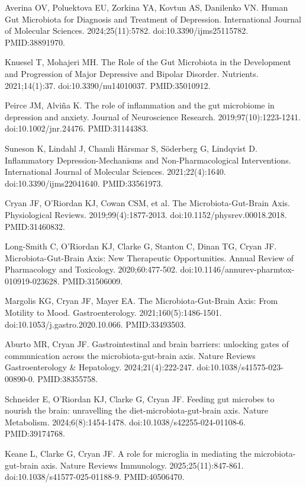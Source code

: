 \documentclass[12pt,oneside]{book}
\newcommand{\reff}[2]{\par\hangindent=7mm\hangafter=1\noindent[#1]\hspace{2mm}#2\par}
\begin{document}
\reff{50}{Averina OV, Poluektova EU, Zorkina YA, Kovtun AS, Danilenko VN. Human Gut Microbiota for Diagnosis and Treatment of Depression. International Journal of Molecular Sciences. 2024;25(11):5782. doi:10.3390/ijms25115782. PMID:38891970.}

\reff{51}{Knuesel T, Mohajeri MH. The Role of the Gut Microbiota in the Development and Progression of Major Depressive and Bipolar Disorder. Nutrients. 2021;14(1):37. doi:10.3390/nu14010037. PMID:35010912.}

\reff{52}{Peirce JM, Alviña K. The role of inflammation and the gut microbiome in depression and anxiety. Journal of Neuroscience Research. 2019;97(10):1223-1241. doi:10.1002/jnr.24476. PMID:31144383.}

\reff{53}{Suneson K, Lindahl J, Chamli Hårsmar S, Söderberg G, Lindqvist D. Inflammatory Depression-Mechanisms and Non-Pharmacological Interventions. International Journal of Molecular Sciences. 2021;22(4):1640. doi:10.3390/ijms22041640. PMID:33561973.}

\reff{54}{Cryan JF, O'Riordan KJ, Cowan CSM, et al. The Microbiota-Gut-Brain Axis. Physiological Reviews. 2019;99(4):1877-2013. doi:10.1152/physrev.00018.2018. PMID:31460832.}

\reff{55}{Long-Smith C, O'Riordan KJ, Clarke G, Stanton C, Dinan TG, Cryan JF. Microbiota-Gut-Brain Axis: New Therapeutic Opportunities. Annual Review of Pharmacology and Toxicology. 2020;60:477-502. doi:10.1146/annurev-pharmtox-010919-023628. PMID:31506009.}

\reff{56}{Margolis KG, Cryan JF, Mayer EA. The Microbiota-Gut-Brain Axis: From Motility to Mood. Gastroenterology. 2021;160(5):1486-1501. doi:10.1053/j.gastro.2020.10.066. PMID:33493503.}

\reff{57}{Aburto MR, Cryan JF. Gastrointestinal and brain barriers: unlocking gates of communication across the microbiota-gut-brain axis. Nature Reviews Gastroenterology \& Hepatology. 2024;21(4):222-247. doi:10.1038/s41575-023-00890-0. PMID:38355758.}

\reff{58}{Schneider E, O'Riordan KJ, Clarke G, Cryan JF. Feeding gut microbes to nourish the brain: unravelling the diet-microbiota-gut-brain axis. Nature Metabolism. 2024;6(8):1454-1478. doi:10.1038/s42255-024-01108-6. PMID:39174768.}

\reff{59}{Keane L, Clarke G, Cryan JF. A role for microglia in mediating the microbiota-gut-brain axis. Nature Reviews Immunology. 2025;25(11):847-861. doi:10.1038/s41577-025-01188-9. PMID:40506470.}
\end{document}
